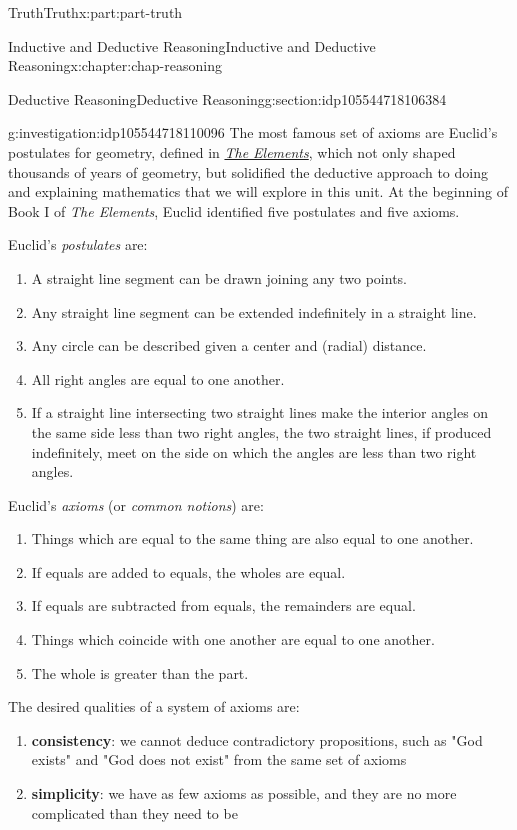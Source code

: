\documentclass[oneside,10pt,]{book}
\newcommand{\terminology}[1]{\textbf{#1}}
\numberwithin{equation}{section}
\begin{document}
\begin{partptx}{Truth}{}{Truth}{}{}{x:part:part-truth}
\begin{chapterptx}{Inductive and Deductive Reasoning}{}{Inductive and Deductive Reasoning}{}{}{x:chapter:chap-reasoning}
\begin{sectionptx}{Deductive Reasoning}{}{Deductive Reasoning}{}{}{g:section:idp105544718106384}
\begin{investigation}{}{g:investigation:idp105544718110096}%
The most famous set of axioms are Euclid's postulates for geometry, defined in \emph{\href{https://en.wikipedia.org/wiki/Euclid's_Elements}{The Elements}\footnotemark{}}, which not only shaped thousands of years of geometry, but solidified the deductive approach to doing and explaining mathematics that we will explore in this unit. At the beginning of Book I of \emph{The Elements}, Euclid identified five postulates and five axioms.%
\par
Euclid's \emph{postulates} are:%
%
\begin{enumerate}
\item{}A straight line segment can be drawn joining any two points.%
\item{}Any straight line segment can be extended indefinitely in a straight line.%
\item{}Any circle can be described given a center and (radial) distance.%
\item{}All right angles are equal to one another.%
\item{}If a straight line intersecting two straight lines make the interior angles on the same side less than two right angles, the two straight lines, if produced indefinitely, meet on the side on which the angles are less than two right angles.%
\end{enumerate}
Euclid's \emph{axioms} (or \emph{common notions}) are:%
%
\begin{enumerate}
\item{}Things which are equal to the same thing are also equal to one another.%
\item{}If equals are added to equals, the wholes are equal.%
\item{}If equals are subtracted from equals, the remainders are equal.%
\item{}Things which coincide with one another are equal to one another.%
\item{}The whole is greater than the part.%
\end{enumerate}
The desired qualities of a system of axioms are:%
%
\begin{enumerate}
\item{}\terminology{consistency}: we cannot deduce contradictory propositions, such as "God exists" and "God does not exist" from the same set of axioms%
\item{}\terminology{simplicity}: we have as few axioms as possible, and they are no more complicated than they need to be%

\end{enumerate}
\end{investigation}
\end{sectionptx}
\end{chapterptx}
\end{partptx}
\end{document}
